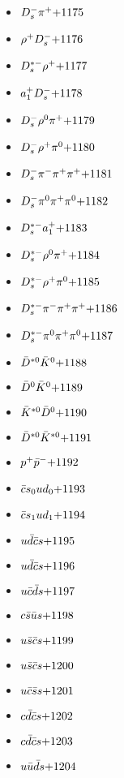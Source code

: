 \begin{multicols}{3}
\begin{itemize}
 \item $ D_{s}^{-} \pi^{+} \hfill{+1175}$
 \item $ \rho^{+} D_{s}^{-} \hfill{+1176}$
 \item $ D_{s}^{*-} \rho^{+} \hfill{+1177}$
 \item $ a_{1}^{+} D_{s}^{-} \hfill{+1178}$
 \item $ D_{s}^{-} \rho^{0} \pi^{+} \hfill{+1179}$
 \item $ D_{s}^{-} \rho^{+} \pi^{0} \hfill{+1180}$
 \item $ D_{s}^{-} \pi^{-} \pi^{+} \pi^{+} \hfill{+1181}$
 \item $ D_{s}^{-} \pi^{0} \pi^{+} \pi^{0} \hfill{+1182}$
 \item $ D_{s}^{*-} a_{1}^{+} \hfill{+1183}$
 \item $ D_{s}^{*-} \rho^{0} \pi^{+} \hfill{+1184}$
 \item $ D_{s}^{*-} \rho^{+} \pi^{0} \hfill{+1185}$
 \item $ D_{s}^{*-} \pi^{-} \pi^{+} \pi^{+} \hfill{+1186}$
 \item $ D_{s}^{*-} \pi^{0} \pi^{+} \pi^{0} \hfill{+1187}$
 \item $ \bar{D}^{*0} \bar{K}^{0} \hfill{+1188}$
 \item $ \bar{D}^{0} \bar{K}^{0} \hfill{+1189}$
 \item $ \bar{K}^{*0} \bar{D}^{0} \hfill{+1190}$
 \item $ \bar{D}^{*0} \bar{K}^{*0} \hfill{+1191}$
 \item $ p^{+} \bar{p}^{-} \hfill{+1192}$
 \item $ \bar{c}s_{0} ud_{0} \hfill{+1193}$
 \item $ \bar{c}s_{1} ud_{1} \hfill{+1194}$
 \item $ u \bar{d} \bar{c} s \hfill{+1195}$
 \item $ u \bar{d} \bar{c} s \hfill{+1196}$
 \item $ u \bar{c} \bar{d} s \hfill{+1197}$
 \item $ c \bar{s} \bar{u} s \hfill{+1198}$
 \item $ u \bar{s} \bar{c} s \hfill{+1199}$
 \item $ u \bar{s} \bar{c} s \hfill{+1200}$
 \item $ u \bar{c} \bar{s} s \hfill{+1201}$
 \item $ c \bar{d} \bar{c} s \hfill{+1202}$
 \item $ c \bar{d} \bar{c} s \hfill{+1203}$
 \item $ u \bar{u} \bar{d} s \hfill{+1204}$

\end{itemize}
\end{multicols}
